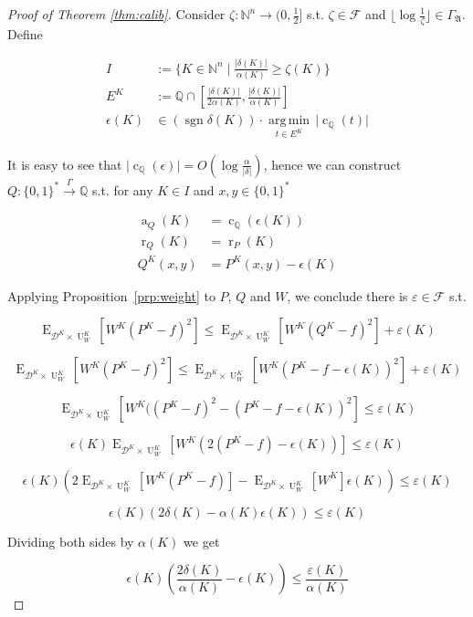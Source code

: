 \documentclass{article}
\numberwithin{equation}{section}
\theoremstyle{definition}
\theoremstyle{plain}
\newcommand{\Bool}{\{0,1\}}
\newcommand{\Words}{{\Bool^*}}
\DeclareMathOperator{\Sgn}{sgn}
\DeclareMathOperator{\E}{E}
\DeclareMathOperator{\R}{r}
\DeclareMathOperator{\A}{a}
\DeclareMathOperator{\Un}{U}
\DeclareMathOperator{\En}{c}
\newcommand{\Argmin}[1]{\underset{#1}{\operatorname{arg\,min}}\,}
\newcommand{\Nats}{\mathbb{N}}
\newcommand{\Rats}{\mathbb{Q}}
\newcommand{\NatFun}{\Nats^n \rightarrow}
\newcommand{\Abs}[1]{\lvert #1 \rvert}
\newcommand{\Floor}[1]{\lfloor #1 \rfloor}
\newcommand{\Dist}{\mathcal{D}}
\newcommand{\GrowA}{\Gamma_{\mathfrak{A}}}
\newcommand{\Fall}{\mathcal{F}}
\newcommand{\Scheme}{\xrightarrow{\Gamma}}
\begin{document}
\begin{proof}[Proof of Theorem \ref{thm:calib}]

Consider $\zeta: \NatFun (0,\frac{1}{2}]$ s.t.  $\zeta \in \Fall$ and $\Floor{\log \frac{1}{\zeta}} \in \GrowA$. Define 

\begin{align*}
I&:=\{K \in \Nats^n \mid \frac{\Abs{\delta(K)}}{\alpha(K)} \geq \zeta(K)\} \\
E^{K}&:=\Rats \cap [\frac{\Abs{\delta(K)}}{2\alpha(K)},\frac{\Abs{\delta(K)}}{\alpha(K)}] \\
\epsilon(K) &\in (\Sgn \delta(K)) \cdot \Argmin{t \in E^{K}} \Abs{\En_\Rats(t)}
\end{align*}

It is easy to see that ${\Abs{\En_\Rats(\epsilon)} = O(\log \frac{\alpha}{\Abs{\delta}})}$, hence we can construct $Q: \Words \Scheme \Rats$ s.t. for any $K \in I$ and $x,y \in \Words$

\begin{align*}
\A_Q(K) &= \En_\Rats(\epsilon(K)) \\
\R_Q(K) &= \R_P(K) \\
Q^{K}(x,y) &= P^{K}(x,y)-\epsilon(K)
\end{align*}

Applying Proposition~\ref{prp:weight} to $P$, $Q$ and $W$, we conclude there is $\varepsilon \in \Fall$ s.t.

$$\E_{\Dist^{K} \times \Un_W^{K}}[W^{K}(P^{K} - f)^2] \leq \E_{\Dist^{K} \times \Un_W^{K}}[W^{K}(Q^{K}-f)^2] + \varepsilon(K)$$

$$\E_{\Dist^{K} \times \Un_W^{K}}[W^{K}(P^{K} - f)^2] \leq \E_{\Dist^{K} \times \Un_W^{K}}[W^{K}(P^{K}-f-\epsilon(K))^2] + \varepsilon(K)$$

$$\E_{\Dist^{K} \times \Un_W^{K}}[W^{K}((P^{K} - f)^2 - (P^{K}-f-\epsilon(K))^2] \leq \varepsilon(K)$$

$$ \epsilon(K) \E_{\Dist^{K} \times \Un_W^{K}}[W^{K}(2(P^{K} - f) - \epsilon(K))] \leq \varepsilon(K)$$

$$ \epsilon(K) (2 \E_{\Dist^{K} \times \Un_W^{K}}[W^{K}(P^{K} - f)]-\E_{\Dist^{K} \times \Un_W^{K}}[W^{K}]\epsilon(K)) \leq \varepsilon(K)$$

$$ \epsilon(K) (2 \delta(K) - \alpha(K)\epsilon(K)) \leq \varepsilon(K)$$

Dividing both sides by $ \alpha(K)$ we get

$$\epsilon(K) (\frac{2\delta(K)}{\alpha(K)} - \epsilon(K)) \leq \frac{\varepsilon(K)}{\alpha(K)}$$


\end{proof}
\end{document}
